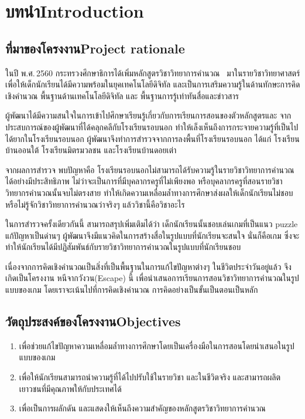 \chapter{\ifcpe บทนำ\else Introduction\fi}

\section{\ifcpe ที่มาของโครงงาน\else Project rationale\fi}
ในปี พ.ศ.\,2560 กระทรวงศึกษาธิการได้เพิ่มหลักสูตรวิชาวิทยาการคำนวณ~\cite{cpc} มาในรายวิชาวิทยาศาสตร์
 เพื่อให้เด็กนักเรียนได้มีความพร้อมในยุคเทคโนโลยีดิจิทัล 
และเป็นการเสริมความรู้ในด้านทักษะการคิดเชิงคำนวณ 
พื้นฐานด้านเทคโนโลยีดิจิทัล และ พื้นฐานการรู้เท่าทันสื่อและข่าวสาร

ผู้พัฒนาได้มีความสนใจในการเข้าไปศึกษาเรียนรู้เกี่ยวกับการเรียนการสอนของตัวหลักสูตรและ
จากประสบการณ์ของผู้พัฒนาที่ได้คลุกคลีกับโรงเรียนรอบนอก
ทำให้เล็งเห็นถึงการกระจายความรู้ที่เป็นไปได้ยากในโรงเรียนรอบนอก ผู้พัฒนาจึงทำการสำรวจจากการลงพื้นที่โรงเรียนรอบนอก
 ได้แก่ โรงเรียนบ้านออนใต้ โรงเรียนมิตรมวลชน และโรงเรียนบ้านดอยเต่า

จากผลการสำรวจ พบปัญหาคือ โรงเรียนรอบนอกไม่สามารถได้รับความรู้ในรายวิชาวิทยาการคำนวณได้อย่างมีประสิทธิภาพ 
ไม่ว่าจะเป็นการที่มีบุคลากรครูที่ไม่เพียงพอ หรือบุคลากรครูที่สอนรายวิชาวิทยากรคำนวณนั้นจบไม่ตรงสาย 
ทำให้เกิดความเหลื่อมล้ำทางการศึกษาส่งผลให้เด็กนักเรียนไม่ชอบ หรือไม่รู้จักวิชาวิทยาการคำนวณว่าจริงๆ 
แล้ววิชานี้คือวิชาอะไร

ในการสำรวจครั้งเดียวกันนี้ สามารถสรุปเพิ่มเติมได้ว่า เด็กนักเรียนนั้นชอบเล่นเกมที่เป็นแนว puzzle แก้ปัญหาเป็นด่านๆ ผู้พัฒนาจึงมีแนวคิดในการสร้างสื่อในรูปแบบที่นักเรียนจะสนใจ นั่นก็คือเกม
ซึ่งจะทำให้นักเรียนได้มีปฏิสัมพันธ์กับรายวิชาวิทยาการคำนวณในรูปแบบที่นักเรียนชอบ

เนื่องจากการคิดเชิงคำนวณเป็นสิ่งที่เป็นพื้นฐานในการแก้ไขปัญหาต่างๆ ในชีวิตประจำวันอยู่แล้ว จึงเกิดเป็นโครงงาน หนีจากวังวน(Escape) นี้ เพื่อนำเสนอการเรียนการสอนวิชาวิทยาการคำนวณในรูปแบบของเกม
โดยเราจะเน้นไปที่การคิดเชิงคำนวณ การคิดอย่างเป็นขั้นเป็นตอนเป็นหลัก

\section{\ifcpe วัตถุประสงค์ของโครงงาน\else Objectives\fi}
\begin{enumerate}
    \item เพื่อช่วยแก้ไขปัญหาความเหลื่อมล้ำทางการศึกษาโดยเป็นเครื่องมือในการสอนโดยนำเสนอในรูปแบบของเกม
    \item เพื่อให้นักเรียนสามารถนำความรู้ที่ได้ไปปรับใช้ในรายวิชา และในชีวิตจริง และสามารถผลิตเยาวชนที่มีคุณภาพให้กับประเทศได้
    \item เพื่อเป็นการผลักดัน และแสดงให้เห็นถึงความสำคัญของหลักสูตรวิชาวิทยาการคำนวณ
\end{enumerate}

